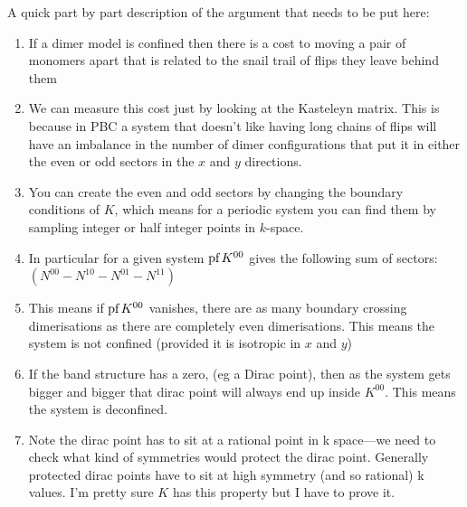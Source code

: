 \documentclass[11pt, oneside]{article} %
\numberwithin{equation}{section}
\begin{document}
\begin{shaded}
    A quick part by part description of the argument that needs to be put here:
    \begin{enumerate}
        \item If a dimer model is confined then there is a cost to moving a pair of monomers apart that is related to the snail trail of flips they leave behind them
        \item We can measure this cost just by looking at the Kasteleyn matrix. This is because in PBC a system that doesn't like having long chains of flips will have an imbalance in the number of dimer configurations that put it in either the even or odd sectors in the $x$ and $y$ directions. 
        \item You can create the even and odd sectors by changing the boundary conditions of $K$, which means for a periodic system you can find them by sampling integer or half integer points in $k$-space.
        \item In particular for a given system $\textup{pf}\, K^{{00}}$ gives the following sum of sectors: $(N^{00} - N^{10}-N^{01}-N^{11})$
        \item This means if $\textup{pf}\, K^{00}$ vanishes, there are as many boundary crossing dimerisations as there are completely even dimerisations. This means the system is not confined (provided it is isotropic in $x$ and $y$)
        \item If the band structure has a zero, (eg a Dirac point), then as the system gets bigger and bigger that dirac point will always end up inside $K^{00}$. This means the system is deconfined.
        \item Note the dirac point has to sit at a rational point in k space---we need to check what kind of symmetries would protect the dirac point. Generally protected dirac points have to sit at high symmetry (and so rational) k values. I'm pretty sure $K$ has this property but I have to prove it.
    \end{enumerate}
\end{shaded}
\end{document}
